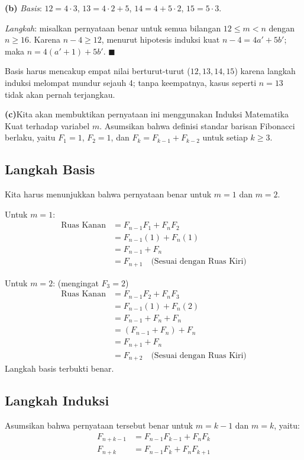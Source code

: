 \documentclass[11pt,a4paper]{article}
\begin{document}
\textbf{(b)} \emph{Basis}: $12 = 4\cdot3$, $13 = 4\cdot2 + 5$, $14 = 4 + 5\cdot2$,
$15 = 5 \cdot 3$.

\emph{Langkah}: misalkan pernyataan benar untuk semua bilangan $12 \le m < n$
dengan $n \ge 16$. Karena $n - 4 \ge 12$, menurut hipotesis induksi kuat
$n - 4 = 4a' + 5b'$; maka $n = 4(a'+1) + 5b'$. $\blacksquare$

Basis harus mencakup empat nilai berturut-turut ($12,13,14,15$) karena langkah
induksi melompat mundur sejauh 4; tanpa keempatnya, kasus seperti $n = 13$
tidak akan pernah terjangkau.

\textbf{(c)}Kita akan membuktikan pernyataan ini menggunakan Induksi Matematika Kuat terhadap variabel $m$. Asumsikan bahwa definisi standar barisan Fibonacci berlaku, yaitu $F_1 = 1$, $F_2 = 1$, dan $F_k = F_{k-1} + F_{k-2}$ untuk setiap $k \geq 3$.

\subsection*{Langkah Basis}
Kita harus menunjukkan bahwa pernyataan benar untuk $m = 1$ dan $m = 2$.

Untuk $m = 1$:
\begin{align*}
\text{Ruas Kanan} &= F_{n-1}F_1 + F_nF_2 \\
&= F_{n-1}(1) + F_n(1) \\
&= F_{n-1} + F_n \\
&= F_{n+1} \quad \text{(Sesuai dengan Ruas Kiri)}
\end{align*}

Untuk $m = 2$: (mengingat $F_3 = 2$)
\begin{align*}
\text{Ruas Kanan} &= F_{n-1}F_2 + F_nF_3 \\
&= F_{n-1}(1) + F_n(2) \\
&= F_{n-1} + F_n + F_n \\
&= (F_{n-1} + F_n) + F_n \\
&= F_{n+1} + F_n \\
&= F_{n+2} \quad \text{(Sesuai dengan Ruas Kiri)}
\end{align*}
Langkah basis terbukti benar.

\subsection*{Langkah Induksi}
Asumsikan bahwa pernyataan tersebut benar untuk $m = k-1$ dan $m = k$, yaitu:
\begin{align}
F_{n+k-1} &= F_{n-1}F_{k-1} + F_nF_k \\
F_{n+k} &= F_{n-1}F_k + F_nF_{k+1}
\end{align}
\end{document}
